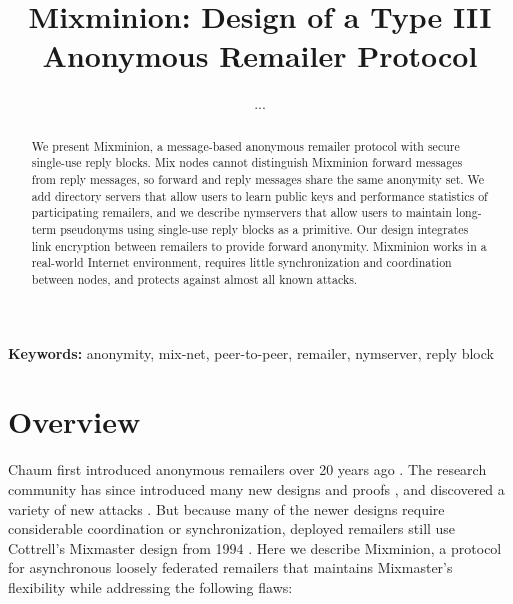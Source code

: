 \documentclass[11pt]{IEEEtran}
\newcommand\emailaddr{\begingroup \def\UrlLeft{<}\def\UrlRight{>}\urlstyle{tt}\Url}
\begin{document}

\title{Mixminion: Design of a Type III Anonymous Remailer Protocol}

% 
\author{...}

\maketitle
\pagestyle{plain} 
 
\begin{abstract}

We present Mixminion, a message-based anonymous remailer protocol with
secure single-use reply blocks. Mix nodes cannot distinguish
Mixminion forward messages from reply messages, so forward and reply
messages share
the same anonymity set. We add directory servers that allow users to
learn public keys and performance statistics of participating remailers,
and we describe nymservers that allow users to maintain long-term
pseudonyms using single-use reply blocks as a primitive. Our design
integrates link encryption between remailers to provide
forward anonymity. Mixminion works in a real-world Internet environment,
requires little synchronization and coordination between nodes, and
protects against almost all known attacks.

\end{abstract}

\begin{center}
\textbf{Keywords:} anonymity, mix-net, peer-to-peer, remailer, nymserver, reply block
\end{center}


\section{Overview}
\label{sec:intro}

Chaum first introduced anonymous remailers over 20 years ago
\cite{chaum-mix}. The research community has since introduced many new
designs and proofs
\cite{abe}\cite{babel}\cite{flash-mix}\cite{kesdogan}\cite{shuffle}\cite{hybrid-mix}, 
and discovered a variety of new attacks 
\cite{back-traffic-analysis}\cite{langos02}\cite{disad-free-routes}\cite{desmedt}\cite{mitkuro}\cite{raymond00}.
But because many of the newer designs require considerable coordination or
synchronization, deployed remailers still use Cottrell's Mixmaster
design from 1994 \cite{mixmaster-attacks}\cite{mixmaster-spec}. Here we describe
Mixminion, a protocol for asynchronous loosely federated remailers that
maintains Mixmaster's flexibility while addressing the following flaws:
\end{document}
